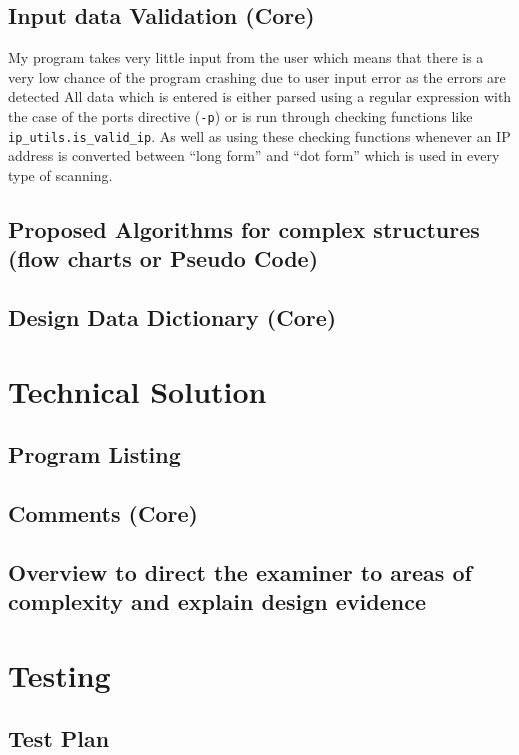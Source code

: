 \documentclass[titlepage]{article}
\begin{document}
\subsection{Input data Validation (Core)}

My program takes very little input from the user which means that there is a very low chance of the program
crashing due to user input error as the errors are detected
All data which is entered is either parsed using a regular expression with the case of the
ports directive (\verb|-p|) or is run through checking functions like \verb|ip_utils.is_valid_ip|.
As well as using these checking functions whenever an IP address is converted between ``long form''
and ``dot form'' which is used in every type of scanning.

\subsection{Proposed Algorithms for complex structures (flow charts or Pseudo Code)}

\subsection{Design Data Dictionary (Core)}

\section{Technical Solution}

\subsection{Program Listing}

\subsection{Comments (Core)}

\subsection{Overview to direct the examiner to areas of complexity and explain design evidence}

\section{Testing}

\subsection{Test Plan}
\end{document}
